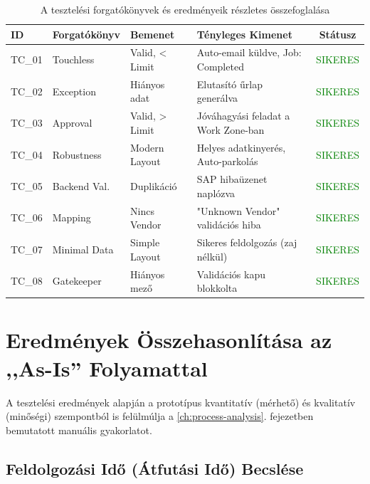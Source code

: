 \begin{table}[H]
    \centering
    \small 
    \begin{tabular}{|l|l|l|p{5cm}|c|}
        \hline
        \textbf{ID} & \textbf{Forgatókönyv} & \textbf{Bemenet} & \textbf{Tényleges Kimenet} & \textbf{Státusz} \\ \hline
        TC\_01 & Touchless & Valid, < Limit & Auto-email küldve, Job: Completed & \textcolor{green}{SIKERES} \\ \hline
        TC\_02 & Exception & Hiányos adat & Elutasító űrlap generálva & \textcolor{green}{SIKERES} \\ \hline
        TC\_03 & Approval & Valid, > Limit & Jóváhagyási feladat a Work Zone-ban & \textcolor{green}{SIKERES} \\ \hline
        TC\_04 & Robustness & Modern Layout & Helyes adatkinyerés, Auto-parkolás & \textcolor{green}{SIKERES} \\ \hline
        TC\_05 & Backend Val. & Duplikáció & SAP hibaüzenet naplózva & \textcolor{green}{SIKERES} \\ \hline
        TC\_06 & Mapping & Nincs Vendor & "Unknown Vendor" validációs hiba & \textcolor{green}{SIKERES} \\ \hline
        TC\_07 & Minimal Data & Simple Layout & Sikeres feldolgozás (zaj nélkül) & \textcolor{green}{SIKERES} \\ \hline
        TC\_08 & Gatekeeper & Hiányos mező & Validációs kapu blokkolta & \textcolor{green}{SIKERES} \\ \hline
    \end{tabular}
    \caption{A tesztelési forgatókönyvek és eredményeik részletes összefoglalása}
    \label{tab:test_results_summary_full}
\end{table}


\section{Eredmények Összehasonlítása az ,,As-Is'' Folyamattal}
\label{sec:eval_comparison}

A tesztelési eredmények alapján a prototípus kvantitatív (mérhető) és kvalitatív (minőségi) szempontból is felülmúlja a \ref{ch:process-analysis}. fejezetben bemutatott manuális gyakorlatot.


\subsection{Feldolgozási Idő (Átfutási Idő) Becslése}
\label{ssec:eval_time_reduction}

